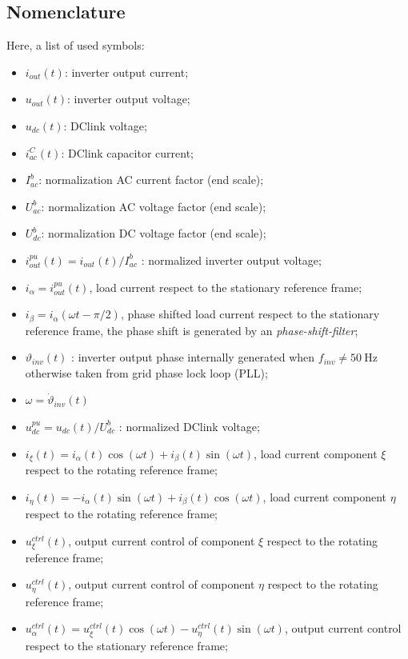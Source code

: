 \documentclass[12pt,a4paper]{scrartcl}
\begin{document}
\begin{onehalfspace}
\subsection{Nomenclature}	
Here, a list of used symbols:
\begin{itemize}
	\item[--] $i_{out}(t)$: inverter output current;
	\item[--] $u_{out}(t)$: inverter output voltage;	
	\item[--] $u_{dc}(t)$: DClink voltage;
	\item[--] $i_{ac}^{C}(t)$: DClink capacitor current;
	\item[--] $I_{ac}^{b}$: normalization AC current factor (end scale);
	\item[--] $U_{ac}^{b}$: normalization AC voltage factor (end scale);
	\item[--] $U_{dc}^{b}$: normalization DC voltage factor (end scale);
	\item[--] $i_{out}^{pu}(t) = i_{out}(t)/I_{ac}^{b}$ : normalized inverter output voltage;	
	\item[--] $i_\alpha = i_{out}^{pu}(t)$, load current respect to the stationary reference frame;
	\item[--] $i_\beta = i_\alpha(\omega t - \pi/2)$, phase shifted load current respect to the stationary reference frame, the phase shift is generated by an \textit{phase-shift-filter};
	\item[--] $\vartheta_{inv}(t)$ : inverter output phase internally generated when $f_{inv} \ne \SI{50}{\hertz}$ otherwise taken from grid phase lock loop (PLL);
	\item[--] $\omega = \dot{\vartheta}_{inv}(t)$
	\item[--] $u_{dc}^{pu} = u_{dc}(t)/U_{dc}^{b}$ : normalized DClink voltage;
	\item[--] $i_\xi(t) = i_\alpha(t)\cos(\omega t) + i_\beta(t)\sin(\omega t)$, load current component $\xi$ respect to the rotating reference frame;
	\item[--] $i_\eta(t) = -i_\alpha(t)\sin(\omega t) + i_\beta(t)\cos(\omega t)$, load current component $\eta$ respect to the rotating reference frame;
	\item[--] $u_\xi^{ctrl}(t)$, output current control of component $\xi$ respect to the rotating reference frame;
	\item[--] $u_\eta^{ctrl}(t)$, output current control of component $\eta$ respect to the rotating reference frame;
	\item[--] $u_\alpha^{ctrl}(t) = u_\xi^{ctrl}(t)\cos(\omega t) - u_\eta^{ctrl}(t)\sin(\omega t)$, output current control respect to the stationary reference frame;
\end{itemize}


\end{onehalfspace}
\end{document}
